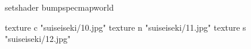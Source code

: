 setshader bumpspecmapworld

    texture c "suiseiseki/10.jpg"
    texture n "suiseiseki/11.jpg"
    texture s "suiseiseki/12.jpg"
